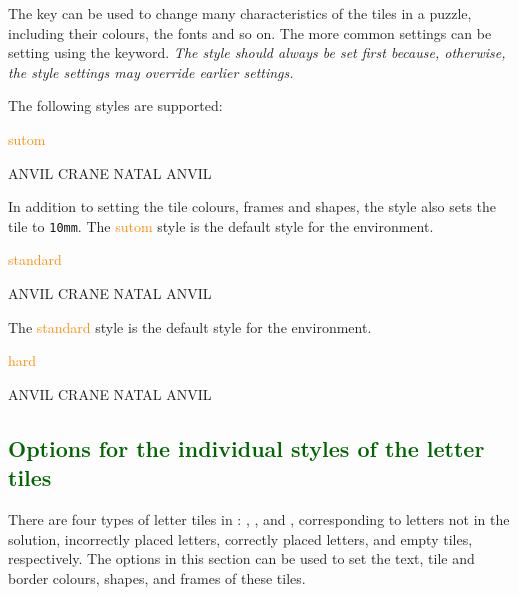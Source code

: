 \documentclass[svgnames]{report}
\newcommand\Section[1]{\subsection{\textcolor{DarkGreen}{#1}}}
\begin{document}
  The  key can be used to change many characteristics of
  the tiles in a  puzzle, including their colours, the
  fonts and so on.  The more common settings can be setting using the
   keyword. \textit{The style should always be set first
  because, otherwise, the style settings may override earlier settings.}

  The following styles are supported:

  \textcolor{DarkOrange}{sutom}

  \begin{example}
  \begin{wordle}[style=sutom]{ANVIL}
    CRANE
    NATAL
    ANVIL
  \end{wordle}
  \end{example}

  In addition to setting the tile colours, frames and shapes, the
   style also sets the tile  to
  \texttt{10mm}.  The \textcolor{DarkOrange}{sutom} style is the default
  style for the  environment.

  \textcolor{DarkOrange}{standard}

  \begin{example}
  \begin{wordle}[style=standard]{ANVIL}
    CRANE
    NATAL
    ANVIL
  \end{wordle}
  \end{example}

  The \textcolor{DarkOrange}{standard} style is the default style for the
   environment.

  \textcolor{DarkOrange}{hard}

  \begin{example}
  \begin{wordle}[style=hard]{ANVIL}
    CRANE
    NATAL
    ANVIL
  \end{wordle}
  \end{example}

  \Section{Options for the individual styles of the letter tiles}

  There are four types of letter tiles in :
  , ,  and
  , corresponding to letters not in the solution,
  incorrectly placed letters, correctly placed letters, and empty
  tiles, respectively. The options in this section can be used to set
  the text, tile and border colours, shapes, and frames of these tiles.
\end{document}
